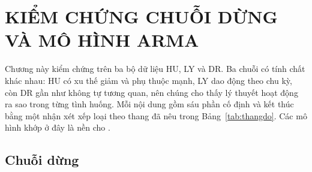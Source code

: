 \section[Kiểm chứng chuỗi dừng và mô hình ARMA]{KIỂM CHỨNG CHUỖI DỪNG VÀ MÔ HÌNH ARMA}

Chương này kiểm chứng  trên ba bộ dữ liệu HU, LY và DR. Ba chuỗi có tính chất khác nhau: HU có xu thế giảm và phụ thuộc mạnh, LY dao động theo chu kỳ, còn DR gần như không tự tương quan, nên chúng cho thấy lý thuyết hoạt động ra sao trong từng tình huống. Mỗi nội dung gồm sáu phần cố định và kết thúc bằng một nhận xét xếp loại theo thang đã nêu trong Bảng~\ref{tab:thangdo}. Các mô hình khớp ở đây là nền cho .

\subsection{Chuỗi dừng}

